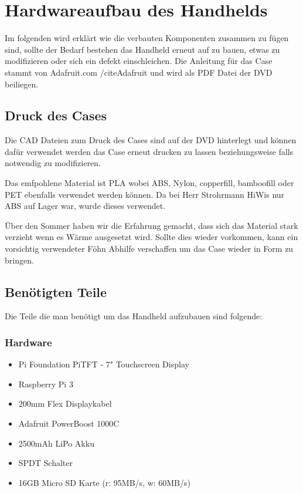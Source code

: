 %
%

\chapter{Hardwareaufbau des Handhelds}

Im folgenden wird erklärt wie die verbauten Komponenten zusammen zu fügen sind, sollte der Bedarf bestehen das Handheld erneut auf zu bauen, etwas zu modifizieren oder sich ein defekt einschleichen. Die Anleitung für das Case stammt von Adafruit.com /cite{Adafruit} und wird als PDF Datei der DVD beiliegen. 

\section{Druck des Cases}

Die CAD Dateien zum Druck des Cases sind auf der DVD hinterlegt und können dafür verwendet werden das Case erneut drucken zu lassen beziehungsweise falls notwendig zu modifizieren. 

Das emfpohlene Material ist PLA wobei ABS, Nylon, copperfill, bamboofill oder PET ebenfalls verwendet werden können. Da bei Herr Strohrmann HiWis nur ABS auf Lager war, wurde dieses verwendet. 

Über den Sommer haben wir die Erfahrung gemacht, dass sich das Material stark verzieht wenn es Wärme ausgesetzt wird. Sollte dies wieder vorkommen, 	 kann ein vorsichtig verwendeter Föhn Abhilfe verschaffen um das Case wieder in Form zu bringen. 

\section{Benötigten Teile}
Die Teile die man benötigt um das Handheld aufzubauen sind folgende:

\newpage
\subsection{Hardware}
\begin{itemize}
\item Pi Foundation PiTFT - 7" Touchscreen Display 
\item Raspberry Pi 3 
\item 200mm Flex Displaykabel
\item Adafruit PowerBoost 1000C
\item 2500mAh LiPo Akku
\item SPDT Schalter
\item 16GB  Micro SD Karte (r: 95MB/s, w: 60MB/s)
\end{itemize} 

